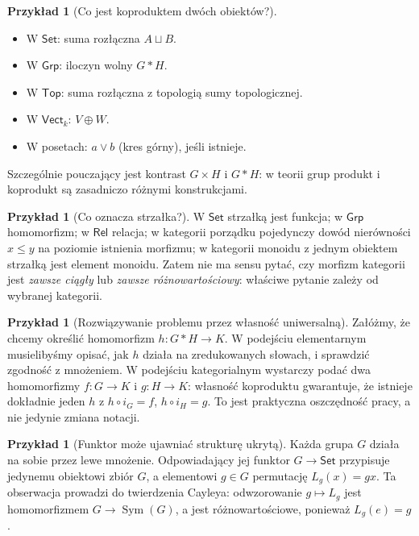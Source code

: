 \documentclass[11pt,a4paper]{article}
\numberwithin{equation}{section}
\theoremstyle{plain}
\theoremstyle{definition}
\newtheorem{przyklad}[twierdzenie]{Przykład}
\theoremstyle{remark}
\newcommand{\cat}[1]{\mathsf{#1}}
\newcommand{\Set}{\cat{Set}}
\newcommand{\Grp}{\cat{Grp}}
\newcommand{\Top}{\cat{Top}}
\newcommand{\Vect}{\cat{Vect}}
\newcommand{\Rel}{\cat{Rel}}
\begin{document}
\begin{przyklad}[Co jest koproduktem dwóch obiektów?]
\leavevmode\par\noindent
\begin{itemize}
\item W $\Set$: suma rozłączna $A\sqcup B$.
\item W $\Grp$: iloczyn wolny $G*H$.
\item W $\Top$: suma rozłączna z topologią sumy topologicznej.
\item W $\Vect_k$: $V\oplus W$.
\item W posetach: $a\vee b$ (kres górny), jeśli istnieje.
\end{itemize}
Szczególnie pouczający jest kontrast $G\times H$ i $G*H$: w teorii grup produkt i koprodukt są zasadniczo różnymi konstrukcjami.
\end{przyklad}

\begin{przyklad}[Co oznacza strzałka?]
W $\Set$ strzałką jest funkcja; w $\Grp$ homomorfizm; w $\Rel$ relacja; w kategorii porządku pojedynczy dowód nierówności $x\leq y$ na poziomie istnienia morfizmu; w kategorii monoidu z jednym obiektem strzałką jest element monoidu. Zatem nie ma sensu pytać, czy morfizm kategorii jest \emph{zawsze ciągły} lub \emph{zawsze różnowartościowy}: właściwe pytanie zależy od wybranej kategorii.
\end{przyklad}

\begin{przyklad}[Rozwiązywanie problemu przez własność uniwersalną]
Załóżmy, że chcemy określić homomorfizm $h:G*H\to K$. W podejściu elementarnym musielibyśmy opisać, jak $h$ działa na zredukowanych słowach, i sprawdzić zgodność z mnożeniem. W podejściu kategorialnym wystarczy podać dwa homomorfizmy $f:G\to K$ i $g:H\to K$: własność koproduktu gwarantuje, że istnieje dokładnie jeden $h$ z $h\circ i_G=f$, $h\circ i_H=g$. To jest praktyczna oszczędność pracy, a nie jedynie zmiana notacji.
\end{przyklad}

\begin{przyklad}[Funktor może ujawniać strukturę ukrytą]
Każda grupa $G$ działa na sobie przez lewe mnożenie. Odpowiadający jej funktor $G\to\Set$ przypisuje jedynemu obiektowi zbiór $G$, a elementowi $g\in G$ permutację $L_g(x)=gx$. Ta obserwacja prowadzi do twierdzenia Cayleya: odwzorowanie $g\mapsto L_g$ jest homomorfizmem $G\to\operatorname{Sym}(G)$, a jest różnowartościowe, ponieważ $L_g(e)=g$.
\end{przyklad}
\end{document}

